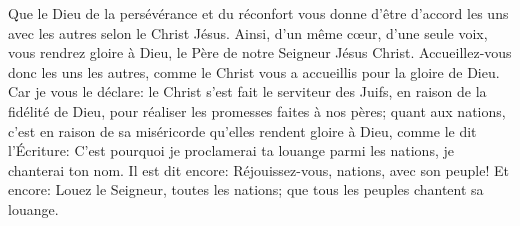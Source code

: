Que le Dieu de la persévérance et du réconfort
	vous donne d’être d’accord les uns avec les autres selon le Christ Jésus.
Ainsi, d’un même cœur, d’une seule voix,
	vous rendrez gloire à Dieu, le Père de notre Seigneur Jésus Christ.
Accueillez-vous donc les uns les autres,
	comme le Christ vous a accueillis pour la gloire de Dieu.
Car je vous le déclare: le Christ s’est fait le serviteur des Juifs,
		en raison de la fidélité de Dieu,
	pour réaliser les promesses faites à nos pères;
	quant aux nations,
		c'est en raison de sa miséricorde qu'elles rendent gloire à Dieu,
	comme le dit l’Écriture:
	C’est pourquoi je proclamerai ta louange parmi les nations,
		je chanterai ton nom.
Il est dit encore: Réjouissez-vous, nations, avec son peuple!
	Et encore: Louez le Seigneur, toutes les nations;
	que tous les peuples chantent sa louange.
